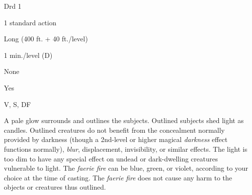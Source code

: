 
\begin{description*}
\item[Level:] Drd 1
\item[Casting Time:] 1 standard action
\item[Range:] Long (400 ft. + 40 ft./level)
\item[Duration:] 1 min./level (D)
\item[Saving Throw:] None
\item[Spell Resistance:] Yes
\item[Components:] V, S, DF
\end{description*}

A pale glow surrounds and outlines the subjects. Outlined subjects shed light as
candles. Outlined creatures do not benefit from the concealment normally provided
by darkness (though a 2nd-level or higher magical \textit{darkness} effect functions
normally), \textit{blur}, displacement, invisibility, or similar effects. The light
is too dim to have any special effect on undead or dark-dwelling creatures vulnerable
to light. The \textit{faerie fire} can be blue, green, or violet, according to
your choice at the time of casting. The \textit{faerie fire} does not cause any
harm to the objects or creatures thus outlined.